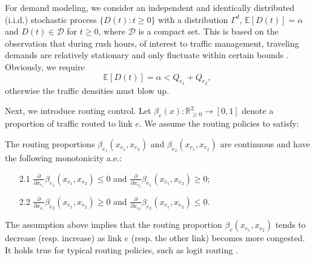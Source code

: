 For demand modeling, we consider an independent and identically distributed (i.i.d.) stochastic process $\{D(t):t\geq0\}$ with a distribution $\Gamma^d$, $\mathbb{E}[D(t)]=\alpha$ and $D(t)\in\mathcal{D}$ for $t\geq 0$, where $\mathcal{D}$ is a compact set. This is based on the observation that during rush hours, of interest to traffic management, traveling demands are relatively stationary and only fluctuate within certain bounds \cite{adot}. Obviously, we require 
\begin{equation}
    \mathbb{E}[D(t)]=\alpha < Q_{e_1} + Q_{e_2}, \label{eq_necess}
\end{equation}
otherwise the traffic densities must blow up.

Next, we introduce routing control. Let $\beta_e(x):\mathbb{R}^2_{\geq0}\to[0,1]$ denote a proportion of traffic routed to link $e$. We assume the routing policies to satisfy:
\begin{asm} 
The routing proportions $\beta_{e_1}(x_{e_1}, x_{e_2})$ and $\beta_{e_2}(x_{e_1}, x_{e_2})$ are continuous and have the following monotonicity a.e.:
\begin{enumerate}
    \item[2.1] $\frac{\partial}{\partial x_{e_1}}\beta_{e_1}(x_{e_1},x_{e_2}) \leq 0$ and  $\frac{\partial}{\partial x_{e_2}}\beta_{e_1}(x_{e_1},x_{e_2}) \geq 0$;
    \item[2.2] $\frac{\partial}{\partial x_{e_1}}\beta_{e_2}(x_{e_1},x_{e_2}) \geq 0$ and  $\frac{\partial}{\partial x_{e_2}}\beta_{e_2}(x_{e_1},x_{e_2}) \leq 0$.
\end{enumerate}
\end{asm}

The assumption above implies that the routing proportion $\beta_{e}(x_{e_1},x_{e_2})$ tends to decrease (resp. increase) as link $e$ (resp. the other link) becomes more congested. It holds true for typical routing policies, such as logit routing \cite{como2011robust}.

